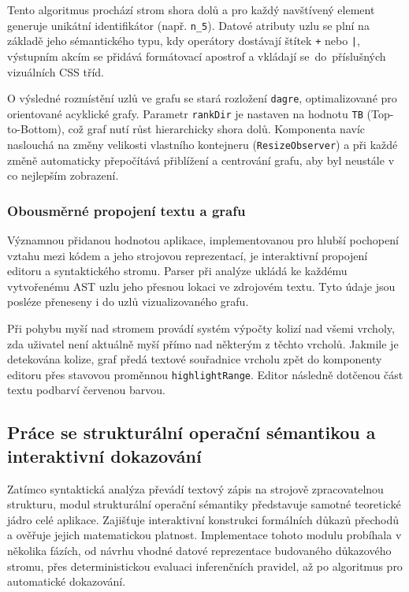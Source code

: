 Tento algoritmus prochází strom shora dolů a pro každý navštívený element generuje unikátní identifikátor (např. \texttt{n\_5}). 
Datové atributy uzlu se plní na základě jeho sémantického typu, kdy operátory dostávají štítek \texttt{+} nebo \texttt{|}, výstupním akcím se přidává formátovací apostrof a vkládají se~do~příslušných vizuálních CSS tříd. 

O výsledné rozmístění uzlů ve grafu se stará rozložení \texttt{dagre}, optimalizované pro orientované acyklické grafy. 
Parametr \texttt{rankDir} je nastaven na hodnotu \texttt{TB} (Top-to-Bottom), což graf nutí růst hierarchicky shora dolů. 
Komponenta navíc naslouchá na změny velikosti vlastního kontejneru (\texttt{ResizeObserver}) a při každé změně automaticky přepočítává přiblížení a centrování grafu, aby byl neustále v co nejlepším zobrazení.

\subsubsection*{Obousměrné propojení textu a grafu}
Významnou přidanou hodnotou aplikace, implementovanou pro hlubší pochopení vztahu mezi kódem a jeho strojovou reprezentací, je interaktivní propojení editoru a syntaktického stromu. 
Parser při analýze ukládá ke každému vytvořenému AST uzlu jeho přesnou lokaci ve zdrojovém textu. 
Tyto údaje jsou posléze přeneseny i do uzlů vizualizovaného grafu.

Při pohybu myší nad stromem provádí systém výpočty kolizí nad všemi vrcholy, zda uživatel není aktuálně myší přímo nad některým z těchto vrcholů. 
Jakmile je detekována kolize, graf předá textové souřadnice vrcholu zpět do komponenty editoru přes stavovou proměnnou \texttt{highlightRange}. 
Editor následně dotčenou část textu podbarví červenou barvou. 

\subsection{Práce se strukturální operační sémantikou a interaktivní dokazování}
\label{sec:sos_logika}
Zatímco syntaktická analýza převádí textový zápis na strojově zpracovatelnou strukturu, modul strukturální operační sémantiky představuje samotné teoretické jádro celé aplikace. 
Zajišťuje interaktivní konstrukci formálních důkazů přechodů a ověřuje jejich matematickou platnost. 
Implementace tohoto modulu probíhala v několika fázích, od návrhu vhodné datové reprezentace budovaného důkazového stromu, přes deterministickou evaluaci inferenčních pravidel, až po algoritmus pro automatické dokazování.

